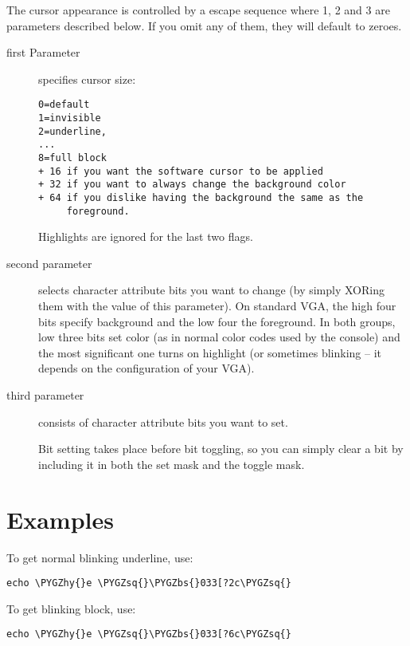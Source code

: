 \documentclass[a4paper,8pt,english]{sphinxmanual}
\def\PYGZbs{\char`\\}
\def\PYGZhy{\char`\-}
\def\PYGZsq{\char`\'}
\renewcommand\PYGZsq{\textquotesingle}
\begin{document}
The cursor appearance is controlled by a \code{\textless{}ESC\textgreater{}{[}?1;2;3c} escape sequence
where 1, 2 and 3 are parameters described below. If you omit any of them,
they will default to zeroes.
\begin{description}
\item[{first Parameter}] \leavevmode
specifies cursor size:

\begin{Verbatim}[commandchars=\\\{\}]
0=default
1=invisible
2=underline,
...
8=full block
+ 16 if you want the software cursor to be applied
+ 32 if you want to always change the background color
+ 64 if you dislike having the background the same as the
     foreground.
\end{Verbatim}

Highlights are ignored for the last two flags.

\item[{second parameter}] \leavevmode
selects character attribute bits you want to change
(by simply XORing them with the value of this parameter). On standard
VGA, the high four bits specify background and the low four the
foreground. In both groups, low three bits set color (as in normal
color codes used by the console) and the most significant one turns
on highlight (or sometimes blinking -- it depends on the configuration
of your VGA).

\item[{third parameter}] \leavevmode
consists of character attribute bits you want to set.

Bit setting takes place before bit toggling, so you can simply clear a
bit by including it in both the set mask and the toggle mask.

\end{description}


\section{Examples}
\label{admin-guide/vga-softcursor:examples}
To get normal blinking underline, use:

\begin{Verbatim}[commandchars=\\\{\}]
echo \PYGZhy{}e \PYGZsq{}\PYGZbs{}033[?2c\PYGZsq{}
\end{Verbatim}

To get blinking block, use:

\begin{Verbatim}[commandchars=\\\{\}]
echo \PYGZhy{}e \PYGZsq{}\PYGZbs{}033[?6c\PYGZsq{}
\end{Verbatim}
\end{document}
